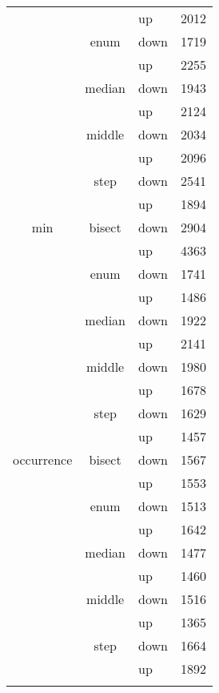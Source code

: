 \begin{longtable}{llll}
          &       & up    & 2012 \\
          & \multicolumn{1}{c}{enum} & down  & 1719 \\
          &       & up    & 2255 \\
          & \multicolumn{1}{c}{median} & down  & 1943 \\
          &       & up    & 2124 \\
          & \multicolumn{1}{c}{middle} & down  & 2034 \\
          &       & up    & 2096 \\
          & \multicolumn{1}{c}{step} & down  & 2541 \\
          &       & up    & 1894 \\ \hline
    \multicolumn{1}{c}{min} & \multicolumn{1}{c}{bisect} & down  & 2904 \\
          &       & up    & 4363 \\
          & \multicolumn{1}{c}{enum} & down  & 1741 \\
          &       & up    & 1486 \\
          & \multicolumn{1}{c}{median} & down  & 1922 \\
          &       & up    & 2141 \\
          & \multicolumn{1}{c}{middle} & down  & 1980 \\
          &       & up    & 1678 \\
          & \multicolumn{1}{c}{step} & down  & 1629 \\
          &       & up    & 1457 \\ \hline
    \multicolumn{1}{c}{occurrence} & \multicolumn{1}{c}{bisect} & down  & 1567 \\
          &       & up    & 1553 \\
          & \multicolumn{1}{c}{enum} & down  & 1513 \\
          &       & up    & 1642 \\
          & \multicolumn{1}{c}{median} & down  & 1477 \\
          &       & up    & 1460 \\
          & \multicolumn{1}{c}{middle} & down  & 1516 \\
          &       & up    & 1365 \\
          & \multicolumn{1}{c}{step} & down  & 1664 \\
          &       & up    & 1892 \\
  \label{tab: heuristicas_operadores}%
  
\end{longtable}%